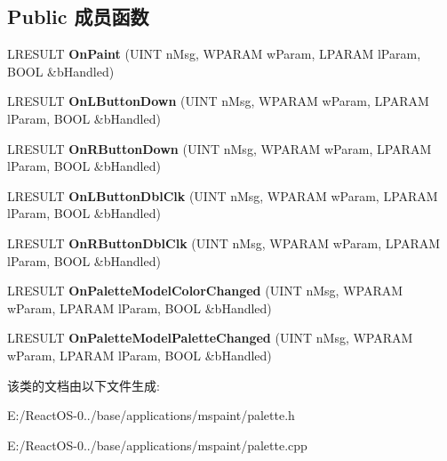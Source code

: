 \subsection*{Public 成员函数}
\begin{DoxyCompactItemize}
\item 
\mbox{\label{class_c_palette_window_a6def4d1e929c9cdf9fa94f6709ce9f8e}} 
L\+R\+E\+S\+U\+LT {\bfseries On\+Paint} (U\+I\+NT n\+Msg, W\+P\+A\+R\+AM w\+Param, L\+P\+A\+R\+AM l\+Param, B\+O\+OL \&b\+Handled)
\item 
\mbox{\label{class_c_palette_window_ad0caf29385728e3ea766cc44a2da3934}} 
L\+R\+E\+S\+U\+LT {\bfseries On\+L\+Button\+Down} (U\+I\+NT n\+Msg, W\+P\+A\+R\+AM w\+Param, L\+P\+A\+R\+AM l\+Param, B\+O\+OL \&b\+Handled)
\item 
\mbox{\label{class_c_palette_window_ac26577fbceb365b6db22d06dbb413117}} 
L\+R\+E\+S\+U\+LT {\bfseries On\+R\+Button\+Down} (U\+I\+NT n\+Msg, W\+P\+A\+R\+AM w\+Param, L\+P\+A\+R\+AM l\+Param, B\+O\+OL \&b\+Handled)
\item 
\mbox{\label{class_c_palette_window_a73e01e35f509e59627e3759edb07be26}} 
L\+R\+E\+S\+U\+LT {\bfseries On\+L\+Button\+Dbl\+Clk} (U\+I\+NT n\+Msg, W\+P\+A\+R\+AM w\+Param, L\+P\+A\+R\+AM l\+Param, B\+O\+OL \&b\+Handled)
\item 
\mbox{\label{class_c_palette_window_a369a4339d7d26ce4576de2a6c21d9e71}} 
L\+R\+E\+S\+U\+LT {\bfseries On\+R\+Button\+Dbl\+Clk} (U\+I\+NT n\+Msg, W\+P\+A\+R\+AM w\+Param, L\+P\+A\+R\+AM l\+Param, B\+O\+OL \&b\+Handled)
\item 
\mbox{\label{class_c_palette_window_a472a9401ea6b58d470b64b497e48e922}} 
L\+R\+E\+S\+U\+LT {\bfseries On\+Palette\+Model\+Color\+Changed} (U\+I\+NT n\+Msg, W\+P\+A\+R\+AM w\+Param, L\+P\+A\+R\+AM l\+Param, B\+O\+OL \&b\+Handled)
\item 
\mbox{\label{class_c_palette_window_a48c6bdb1ac8fb53cd7a2ed124c05fafd}} 
L\+R\+E\+S\+U\+LT {\bfseries On\+Palette\+Model\+Palette\+Changed} (U\+I\+NT n\+Msg, W\+P\+A\+R\+AM w\+Param, L\+P\+A\+R\+AM l\+Param, B\+O\+OL \&b\+Handled)
\end{DoxyCompactItemize}


该类的文档由以下文件生成\+:\begin{DoxyCompactItemize}
\item 
E\+:/\+React\+O\+S-\/0../base/applications/mspaint/palette.\+h\item 
E\+:/\+React\+O\+S-\/0../base/applications/mspaint/palette.\+cpp\end{DoxyCompactItemize}
